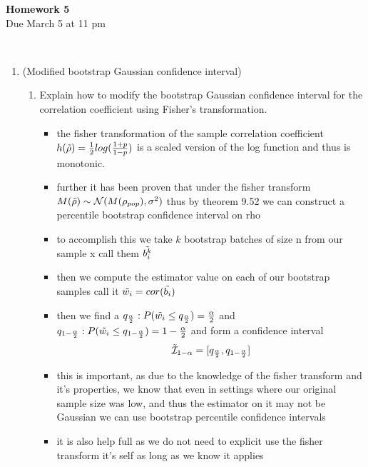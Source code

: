 \documentclass[12pt,twoside]{article}
\begin{document}
\begin{center}
{\large{\textbf{Homework 5}} } \vspace{0.2cm}\\
Due  March 5 at 11 pm
\\
\end{center}
\\

\begin{enumerate}


\item (Modified bootstrap Gaussian confidence interval)
\begin{enumerate}
\item Explain how to modify the bootstrap Gaussian confidence interval for the correlation coefficient using Fisher's transformation. 
\begin{itemize}
\color{blue}
    \item the fisher transformation of the sample correlation coefficient  $h(\Tilde{\rho})=\frac{1}{2}log(\frac{1+p}{1-p})$ is a scaled version of the log function and thus is monotonic. 
    \item further it has been proven that under the fisher transform 
    $M(\Tilde{\rho}) \sim \mathcal{N}(M(\rho_{pop}), \sigma^2)$ thus by theorem 9.52  we can construct a percentile bootstrap confidence interval on rho
    \item to accomplish this we take $k$ bootstrap batches of size n from our sample x call them $\Tilde{b_{i}^{k}}$
    \item then we compute the estimator value on each of our bootstrap samples call it $\Tilde{w_i}=cor(\Tilde{b_{i}})$
    \item then we find a $q_{\frac{\alpha}{2}}:P(\Tilde{w_i}\leq q_{\frac{\alpha}{2}})={\frac{\alpha}{2}} $ and  $q_{1-\frac{\alpha}{2}}:P(\Tilde{w_i}\leq  q_{1-\frac{\alpha}{2}} ) =1-{\frac{\alpha}{2}} $ 
    and form a confidence interval $$\Tilde{\mathcal{I}}_{1-\alpha}=[q_{\frac{\alpha}{2}},q_{1-\frac{\alpha}{2}}]$$
    \item this is important, as due to the knowledge of the fisher transform and it's properties, we know that even in settings where our original sample size was low, and thus the estimator on it may not be Gaussian we can use bootstrap percentile confidence intervals
    \item it is also help full as we do not need to explicit use the fisher transform it's self as long as we know it applies
\end{itemize}



\end{enumerate}
\end{enumerate}
\end{document}
